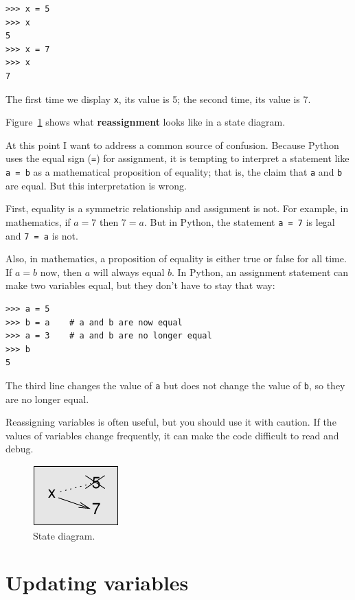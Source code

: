 \documentclass[10pt]{book}
\begin{document}
\begin{verbatim}
>>> x = 5
>>> x
5
>>> x = 7
>>> x
7
\end{verbatim}
%
The first time we display 
{\tt x}, its value is 5; the second time, its
value is 7.

Figure~\ref{fig.assign2} shows what {\bf reassignment} looks
like in a state diagram.  

At this point I want to address a common source of
confusion.
Because Python uses the equal sign ({\tt =}) for assignment, it is
tempting to interpret a statement like {\tt a = b} as a
mathematical
proposition of equality; that is, the claim that {\tt a} and
{\tt b} are equal.  But this interpretation is wrong.

First, equality is a symmetric relationship and assignment is not.  For
example, in mathematics, if $a=7$ then $7=a$.  But in Python, the
statement {\tt a = 7} is legal and {\tt 7 = a} is not.

Also, in mathematics, a proposition of equality is either true or
false for all time.  If $a=b$ now, then $a$ will always equal $b$.
In Python, an assignment statement can make two variables equal, but
they don't have to stay that way:

\begin{verbatim}
>>> a = 5
>>> b = a    # a and b are now equal
>>> a = 3    # a and b are no longer equal
>>> b
5
\end{verbatim}
%
The third line changes the value of {\tt a} but does not change the
value of {\tt b}, so they are no longer equal. 

Reassigning variables is often useful, but you should use it
with caution.  If the values of variables change frequently, it can
make the code difficult to read and debug.

\begin{figure}
\centerline
{\includegraphics[scale=0.8]{figs/assign2.pdf}}
\caption{State diagram.}
\label{fig.assign2}
\end{figure}



\section{Updating variables}
\label{update}
\end{document}
